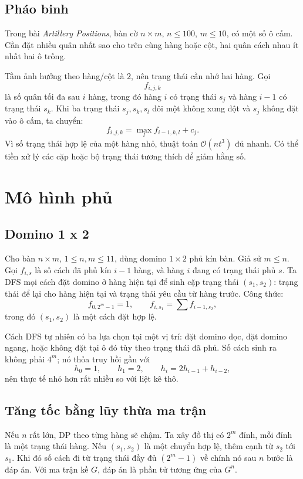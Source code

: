 \documentclass[11pt]{article}
\newcommand{\Oh}{\mathcal{O}}
\begin{document}
\subsection{Pháo binh}

Trong bài \emph{Artillery Positions}, bàn cờ \(n\times m\), \(n\le100\),
\(m\le10\), có một số ô cấm. Cần đặt nhiều quân nhất sao cho trên cùng hàng
hoặc cột, hai quân cách nhau ít nhất hai ô trống.

Tầm ảnh hưởng theo hàng/cột là \(2\), nên trạng thái cần nhớ hai hàng. Gọi
\[
  f_{i,j,k}
\]
là số quân tối đa sau \(i\) hàng, trong đó hàng \(i\) có trạng thái \(s_j\)
và hàng \(i-1\) có trạng thái \(s_k\). Khi ba trạng thái \(s_j,s_k,s_l\) đôi
một không xung đột và \(s_j\) không đặt vào ô cấm, ta chuyển:
\[
  f_{i,j,k}=\max_l f_{i-1,k,l}+c_j.
\]
Vì số trạng thái hợp lệ của một hàng nhỏ, thuật toán \(\Oh(n t^3)\) đủ nhanh.
Có thể tiền xử lý các cặp hoặc bộ trạng thái tương thích để giảm hằng số.

\section{Mô hình phủ}

\subsection{Domino 1 x 2}

Cho bàn \(n\times m\), \(1\le n,m\le11\), dùng domino \(1\times2\) phủ kín
bàn. Giả sử \(m\le n\). Gọi \(f_{i,s}\) là số cách đã phủ kín \(i-1\) hàng,
và hàng \(i\) đang có trạng thái phủ \(s\). Ta DFS mọi cách đặt domino ở hàng
hiện tại để sinh cặp trạng thái \((s_1,s_2)\): trạng thái để lại cho hàng
hiện tại và trạng thái yêu cầu từ hàng trước. Công thức:
\[
  f_{0,2^m-1}=1,\qquad
  f_{i,s_1}=\sum f_{i-1,s_2},
\]
trong đó \((s_1,s_2)\) là một cách đặt hợp lệ.

Cách DFS tự nhiên có ba lựa chọn tại một vị trí: đặt domino dọc, đặt domino
ngang, hoặc không đặt tại ô đó tùy theo trạng thái đã phủ. Số cách sinh ra
không phải \(4^m\); nó thỏa truy hồi gần với
\[
  h_0=1,\qquad h_1=2,\qquad h_i=2h_{i-1}+h_{i-2},
\]
nên thực tế nhỏ hơn rất nhiều so với liệt kê thô.

\subsection{Tăng tốc bằng lũy thừa ma trận}

Nếu \(n\) rất lớn, DP theo từng hàng sẽ chậm. Ta xây đồ thị có \(2^m\) đỉnh,
mỗi đỉnh là một trạng thái hàng. Nếu \((s_1,s_2)\) là một chuyển hợp lệ, thêm
cạnh từ \(s_2\) tới \(s_1\). Khi đó số cách đi từ trạng thái đầy đủ
\((2^m-1)\) về chính nó sau \(n\) bước là đáp án. Với ma trận kề \(G\), đáp án
là phần tử tương ứng của \(G^n\).
\end{document}
